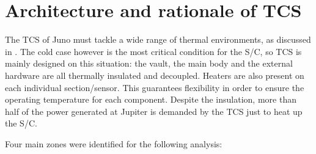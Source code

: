 \section{Architecture and rationale of TCS}
\label{sec:TCS_architecture_rationale}

The TCS of Juno must tackle a wide range of thermal environments, as discussed in \mref.
The cold case however is the most critical condition for the S/C, so TCS is mainly designed on this situation: the vault, the main body and the external hardware are all thermally insulated and decoupled. Heaters are also present on each individual section/sensor. This guarantees flexibility in order to ensure the operating temperature for each component. Despite the insulation, more than half of the power generated at Jupiter is demanded by the TCS just to heat up the S/C. 

Four main zones were identified for the following analysis:

